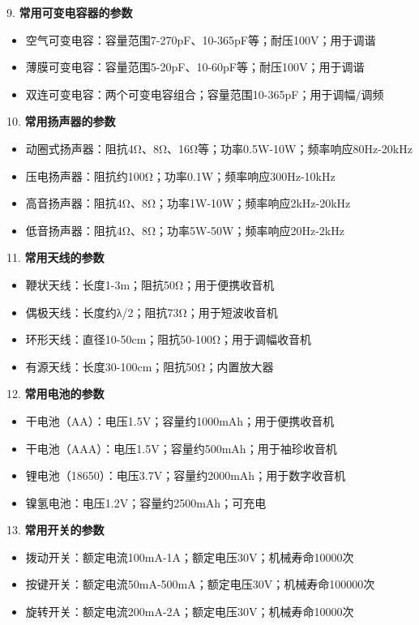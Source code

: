 \documentclass[12pt,UTF8]{ctexbook}
\begin{document}
9. \textbf{常用可变电容器的参数}
   \begin{itemize}[leftmargin=3.5em]
   \item 空气可变电容：容量范围7-270pF、10-365pF等；耐压100V；用于调谐
   \item 薄膜可变电容：容量范围5-20pF、10-60pF等；耐压100V；用于调谐
   \item 双连可变电容：两个可变电容组合；容量范围10-365pF；用于调幅/调频
   \end{itemize}

10. \textbf{常用扬声器的参数}
    \begin{itemize}[leftmargin=3.5em]
    \item 动圈式扬声器：阻抗4Ω、8Ω、16Ω等；功率0.5W-10W；频率响应80Hz-20kHz
    \item 压电扬声器：阻抗约100Ω；功率0.1W；频率响应300Hz-10kHz
    \item 高音扬声器：阻抗4Ω、8Ω；功率1W-10W；频率响应2kHz-20kHz
    \item 低音扬声器：阻抗4Ω、8Ω；功率5W-50W；频率响应20Hz-2kHz
    \end{itemize}

11. \textbf{常用天线的参数}
    \begin{itemize}[leftmargin=3.5em]
    \item 鞭状天线：长度1-3m；阻抗50Ω；用于便携收音机
    \item 偶极天线：长度约λ/2；阻抗73Ω；用于短波收音机
    \item 环形天线：直径10-50cm；阻抗50-100Ω；用于调幅收音机
    \item 有源天线：长度30-100cm；阻抗50Ω；内置放大器
    \end{itemize}

12. \textbf{常用电池的参数}
    \begin{itemize}[leftmargin=3.5em]
    \item 干电池（AA）：电压1.5V；容量约1000mAh；用于便携收音机
    \item 干电池（AAA）：电压1.5V；容量约500mAh；用于袖珍收音机
    \item 锂电池（18650）：电压3.7V；容量约2000mAh；用于数字收音机
    \item 镍氢电池：电压1.2V；容量约2500mAh；可充电
    \end{itemize}

13. \textbf{常用开关的参数}
    \begin{itemize}[leftmargin=3.5em]
    \item 拨动开关：额定电流100mA-1A；额定电压30V；机械寿命10000次
    \item 按键开关：额定电流50mA-500mA；额定电压30V；机械寿命100000次
    \item 旋转开关：额定电流200mA-2A；额定电压30V；机械寿命10000次
    \end{itemize}
\end{document}
